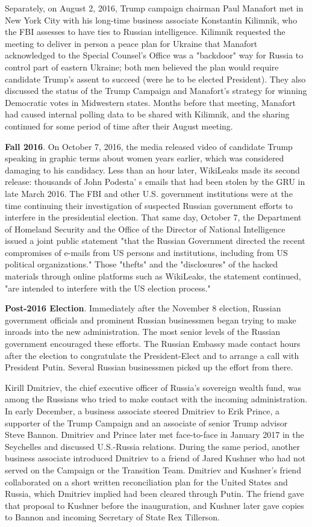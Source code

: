 \documentclass{article}
\begin{document}
Separately, on August 2, 2016, Trump campaign chairman Paul Manafort met in New York City with his long-time business associate Konstantin Kilimnik, who the FBI assesses to have ties to Russian intelligence.
Kilimnik requested the meeting to deliver in person a peace plan for Ukraine that Manafort acknowledged to the Special Counsel's Office was a "backdoor" way for Russia to control part of eastern Ukraine; both men believed the plan would require candidate Trump's assent to succeed (were he to be elected President).
They also discussed the status of the Trump Campaign and Manafort's strategy for winning Democratic votes in Midwestern states.
Months before that meeting, Manafort had caused internal polling data to be shared with Kilimnik, and the sharing continued for some period of time after their August meeting.

\textbf{Fall 2016}.
On October 7, 2016, the media released video of candidate Trump speaking in graphic terms about women years earlier, which was considered damaging to his candidacy.
Less than an hour later, WikiLeaks made its second release: thousands of John Podesta' s emails that had been stolen by the GRU in late March 2016.
The FBI and other U.S. government institutions were at the time continuing their investigation of suspected Russian government efforts to interfere in the presidential election.
That same day, October 7, the Department of Homeland Security and the Office of the Director of National Intelligence issued a joint public statement "that the Russian Government directed the recent compromises of e-mails from US persons and institutions, including from US political organizations."
Those "thefts" and the "disclosures" of the hacked materials through online platforms such as WikiLeaks, the statement continued, "are intended to interfere with the US election process."

\textbf{Post-2016 Election}.
Immediately after the November 8 election, Russian government officials and prominent Russian businessmen began trying to make inroads into the new administration.
The most senior levels of the Russian government encouraged these efforts.
The Russian Embassy made contact hours after the election to congratulate the President-Elect and to arrange a call with President Putin.
Several Russian businessmen picked up the effort from there.

Kirill Dmitriev, the chief executive officer of Russia's sovereign wealth fund, was among the Russians who tried to make contact with the incoming administration.
In early December, a business associate steered Dmitriev to Erik Prince, a supporter of the Trump Campaign and an associate of senior Trump advisor Steve Bannon.
Dmitriev and Prince later met face-to-face in January 2017 in the Seychelles and discussed U.S.-Russia relations.
During the same period, another business associate introduced Dmitriev to a friend of Jared Kushner who had not served on the Campaign or the Transition Team.
Dmitriev and Kushner's friend collaborated on a short written reconciliation plan for the United States and Russia, which Dmitriev implied had been cleared through Putin.
The friend gave that proposal to Kushner before the inauguration, and Kushner later gave copies to Bannon and incoming Secretary of State Rex Tillerson.
\end{document}
